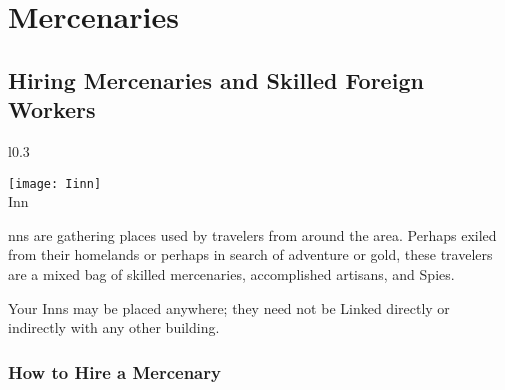 
\chapter{Mercenaries}


\section{Hiring Mercenaries and Skilled Foreign Workers}


\begin{wrapfigure}{l}{0.3\textwidth}
    \vspace{-20pt}
    \begin{center}
        \texttt{[image: Iinn]} %
        \\ Inn %
    \end{center}
    \vspace{-30pt}
\end{wrapfigure}

nns are gathering places used by travelers from around the area. Perhaps exiled from their homelands or perhaps in search of adventure or gold, these travelers are a mixed bag of skilled mercenaries, accomplished artisans, and Spies.

Your Inns may be placed anywhere; they need not be Linked directly or indirectly with any other building.

\subsection{How to Hire a Mercenary}

